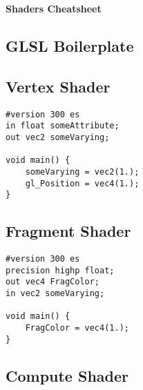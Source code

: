\documentclass{article}
\begin{document}
    \begin{landscape}
        \begin{center}
            \begin{LARGE}
                \textbf{Shaders Cheatsheet}
            \end{LARGE}
        \end{center}
        \begin{multicols}{3}

            \section{GLSL Boilerplate}
            \subsection{Vertex Shader}
            \begin{verbatim}
#version 300 es
in float someAttribute;
out vec2 someVarying;

void main() {
    someVarying = vec2(1.);
    gl_Position = vec4(1.);
}
            \end{verbatim}

            \subsection{Fragment Shader}
            \begin{verbatim}
#version 300 es
precision highp float;
out vec4 FragColor;
in vec2 someVarying;

void main() {
    FragColor = vec4(1.);
}
            \end{verbatim}
            \subsection{Compute Shader}

\end{multicols}
\end{landscape}
\end{document}
